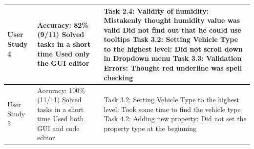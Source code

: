 \begin{table}[!htbp]
\begin{tabular}{lp{4.5cm}p{6cm}}
        User Study 4 &
            Accuracy: 82\%(9/11)\newline
            Solved tasks in a short time\newline
            Used only the GUI editor

            &

            Task 2.4: Validity of humidity:\newline
            Mistakenly thought humidity value was valid\newline
            Did not find out that he could use tooltips\newline
            Task 3.2: Setting Vehicle Type to the highest level: \newline
            Did not scroll down in Dropdown menu\newline
            Task 3.3: Validation Errors:\newline
            Thought red underline was spell checking \\ \midrule

        User Study 5 &
            Accuracy: 100\%(11/11)\newline
            Solved tasks in a short time\newline
            Used both GUI and code editor

            &

            Task 3.2: Setting Vehicle Type to the highest level: \newline
            Took some time to find the vehicle type \newline
            Task 4.2: Adding new property:\newline
        Did not set the property type at the beginning \\ \bottomrule
    \end{tabular}
\end{table}


